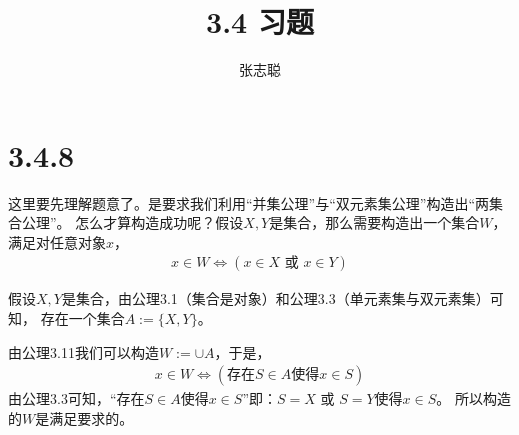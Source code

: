 \documentclass{article}
\begin{document}
\title{3.4 习题}
\author{张志聪}
\maketitle

\section*{3.4.8}

\begin{zremark}
      这里要先理解题意了。是要求我们利用“并集公理”与“双元素集公理”构造出“两集合公理”。
      怎么才算构造成功呢？假设$X,Y$是集合，那么需要构造出一个集合$W$，满足对任意对象$x$，
      \begin{align*}
            x \in W \Leftrightarrow (x \in X \text{ 或 } x \in Y)
      \end{align*}
\end{zremark}
假设$X,Y$是集合，由公理3.1（集合是对象）和公理3.3（单元素集与双元素集）可知，
存在一个集合$A := \{X, Y\}$。

由公理3.11我们可以构造$W := \cup A$，于是，
\begin{align*}
      x \in  W  \Leftrightarrow (\text{存在}S \in A \text{使得} x \in S)
\end{align*}
由公理3.3可知，“$\text{存在}S \in A \text{使得} x \in S$”即：$S=X \text{ 或 } S=Y$使得$x \in S$。
所以构造的$W$是满足要求的。
\end{document}
